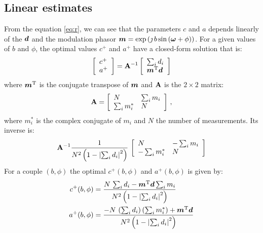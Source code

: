 \documentclass[a4paper,11pt,twoside]{scrartcl}
\begin{document}
\subsection{Linear estimates}
From the equation \ref{eq:r}, we can see that the parameters  $c$ and $a$ depends linearly of the  $\boldsymbol{d}$ and the modulation phasor $\boldsymbol{m} = \exp\left( \jmath \, b \sin\left( \boldsymbol{\omega} + \phi\right)\right)$. For a given values of $b$ and $\phi$, the optimal values $c^+$ and $a^+$ have a closed-form solution that is:
\begin{equation}
    \left[\begin{array}{l}
    c^+\\
    a^+
    \end{array}\right] = \mathbf{A}^{-1} 
    \left[\begin{array}{l}
    \sum_i d_i\\
    \boldsymbol{m}^{\mathrm{T}}\boldsymbol{d}
    \end{array}\right] 
\end{equation}
where $\boldsymbol{m}^{\mathrm{T}}$ is the conjugate transpose of $\boldsymbol{m}$ and $\mathbf{A}$ is the $2\times2$ matrix:
\begin{equation}
    \mathbf{A} = \left[\begin{array}{ll}
    N & \sum_i m_i\\
    \sum_i  m_i^* & N
    \end{array}\right] \,,
\end{equation}
where $m_i^*$ is the complex conjugate of $m_i$ and $N$  the number of measurements. Its inverse is:
\begin{equation}
   \mathbf{A}^{-1} \frac{1}{N^2 \left(1 - \left\vert  \sum_i d_i\right\vert^2\right)}\,\left[\begin{array}{ll}
    N & - \sum_i m_i\\
    - \sum_i  m_i^* & N
    \end{array}\right] 
\end{equation}
For a couple $(b,\phi)$ the optimal $c^+(b,\phi)$ and $a^+(b,\phi)$ is given by:
\begin{align}
    c^+(b,\phi) &= \frac{N\,\sum_i d_i - \boldsymbol{m}^{\mathrm{T}}\boldsymbol{d}\sum_i m_i}{N^2 \left(1 - \left\vert  \sum_i d_i\right\vert^2\right)}\\
    a^+(b,\phi) &= \frac{ -N\,\left(\sum_i d_i\right)  \left(\sum_i  m_i^*\right)+ \boldsymbol{m}^{\mathrm{T}}\boldsymbol{d}}{N^2 \left(1 - \left\vert  \sum_i d_i\right\vert^2\right)}
\end{align}
\end{document}
